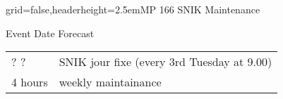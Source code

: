 \documentclass[english]{kiesgrube}
\begin{document}
\begin{poster}{grid=false,headerheight=2.5em}{}{MP 166 SNIK Maintenance}{}{}
\begin{posterbox}[name=event,column=1,below=open]{Event Date Forecast}
\begin{tabulary}{\textwidth}{lL}
? ?		&SNIK jour fixe	(every 3rd Tuesday at 9.00)\\
4 hours		&weekly maintainance\\
\end{tabulary}
\end{posterbox}
\footer
\end{poster}

\newpage
\end{document}
